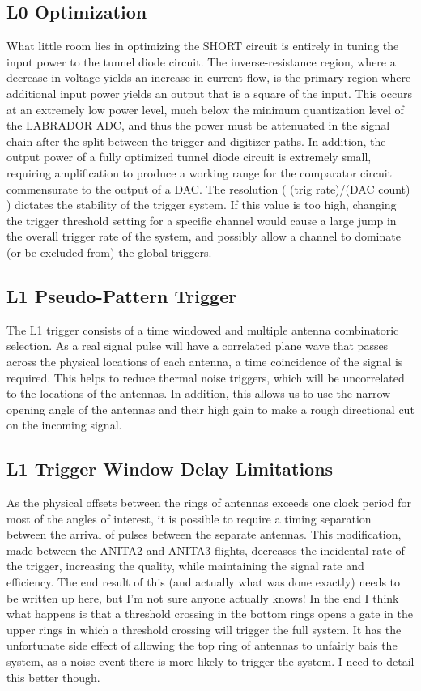 	\subsection{L0 Optimization}
		What little room lies in optimizing the SHORT circuit is entirely in tuning the input power to the tunnel diode circuit.  The inverse-resistance region, where a decrease in voltage yields an increase in current flow, is the primary region where additional input power yields an output that is a square of the input.  This occurs at an extremely low power level, much below the minimum quantization level of the LABRADOR ADC, and thus the power must be attenuated in the signal chain after the split between the trigger and digitizer paths.  In addition, the output power of a fully optimized tunnel diode circuit is extremely small,	requiring amplification to produce a working range for the comparator circuit commensurate to the output of a DAC.  The resolution ( (trig rate)/(DAC count) ) dictates the stability of the trigger system.  If this value is too high, changing the trigger threshold setting for a specific channel would cause a large jump in the overall trigger rate of the system, and possibly allow a channel to dominate (or be excluded from) the global triggers.
		
		
	\subsection{L1 Pseudo-Pattern Trigger}
		The L1 trigger consists of a time windowed and multiple antenna combinatoric selection.  As a real signal pulse will have a correlated plane wave that passes across the physical locations of each antenna, a time coincidence of the signal is required.  This helps to reduce thermal noise triggers, which will be uncorrelated to the locations of the antennas.  In addition, this allows us to use the narrow opening angle of the antennas and their high gain to make a rough directional cut on the incoming signal.
		
	\subsection{L1 Trigger Window Delay Limitations}
		As the physical offsets between the rings of antennas exceeds one clock period for most of the angles of interest, it is possible to require a timing separation between the arrival of pulses between the separate antennas.  This modification, made between the ANITA2 and ANITA3 flights, decreases the incidental rate of the trigger, increasing the quality, while maintaining the signal rate and efficiency.  The end result of this (and actually what was done exactly) needs to be written up here, but I'm not sure anyone actually knows!  In the end I think what happens is that a threshold crossing in the bottom rings opens a gate in the upper rings in which a threshold crossing will trigger the full system.  It has the unfortunate side effect of allowing the top ring of antennas to unfairly bais the system, as a noise event there is more likely to trigger the system.  I need to detail this better though.

